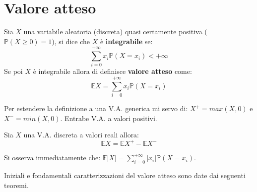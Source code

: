 \section{Valore atteso} \label{Val_att_discr}

\begin{definition}
Sia $X$ una variabile aleatoria (discreta) quasi certamente positiva \big($\mathbb{P}(X\geq0)=1$\big), si dice che $X$ è \textbf{integrabile} se:
\[\sum\limits_{i=0}^{+\infty}x_i\mathbb{P}(X=x_i) < +\infty\]
Se poi $X$ è integrabile allora di definisce \textbf{valore atteso} come:
    \[\mathbb{E}X=\sum\limits_{i=0}^{+\infty}x_i\mathbb{P}(X=x_i)\]
\end{definition}

\vspace{10px}

Per estendere la definizione a una V.A. generica mi servo di: \newline
$X^{+}=max(X,0)$ e $X^{-}=min(X,0)$. Entrabe V.A. a valori positivi.

\vspace{10px}

\begin{definition}
Sia $X$ una V.A. discreta a valori reali allora:
    \[\mathbb{E}X=\mathbb{E}X^+-\mathbb{E}X^-\]
\end{definition}
\vspace{5px}
Si osserva immediatamente che: $\mathbb{E}|X|=\sum\limits_{i=0}^{+\infty}|x_i|\mathbb{P}(X=x_i)$.

Iniziali e fondamentali caratterizzazioni del valore atteso sono date dai seguenti teoremi.

